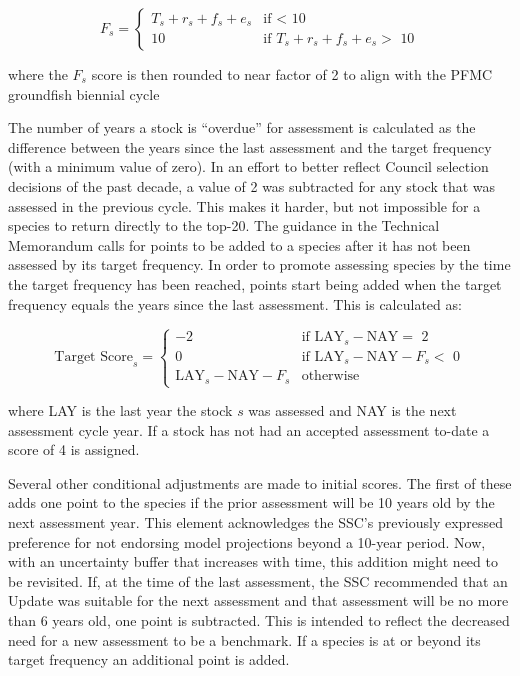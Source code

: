 \documentclass[12pt,]{article}
\begin{document}
\[
F_s =
\begin{cases} 
T_s + r_s + f_s + e_s & \text{if $<$ 10}\\ 
10 & \text{if $T_s + r_s + f_s + e_s >$ 10} 
\end{cases}
\]

where the \(F_s\) score is then rounded to near factor of 2 to align
with the PFMC groundfish biennial cycle

The number of years a stock is ``overdue'' for assessment is calculated
as the difference between the years since the last assessment and the
target frequency (with a minimum value of zero). In an effort to better
reflect Council selection decisions of the past decade, a value of 2 was
subtracted for any stock that was assessed in the previous cycle. This
makes it harder, but not impossible for a species to return directly to
the top-20. The guidance in the Technical Memorandum calls for points to
be added to a species after it has not been assessed by its target
frequency. In order to promote assessing species by the time the target
frequency has been reached, points start being added when the target
frequency equals the years since the last assessment. This is calculated
as:

\[
\text{Target Score}_s = 
\begin{cases}
-2 & \text{if $\text{LAY}_{s} - \text{NAY} =$ 2}\\
0  & \text{if $\text{LAY}_{s} - \text{NAY} - F_s < $ 0}\\
\text{LAY}_{s} - \text{NAY} - F_s & \text{otherwise}
\end{cases}
\]

where LAY is the last year the stock \(s\) was assessed and NAY is the
next assessment cycle year. If a stock has not had an accepted
assessment to-date a score of 4 is assigned.

Several other conditional adjustments are made to initial scores. The
first of these adds one point to the species if the prior assessment
will be 10 years old by the next assessment year. This element
acknowledges the SSC's previously expressed preference for not endorsing
model projections beyond a 10-year period. Now, with an uncertainty
buffer that increases with time, this addition might need to be
revisited. If, at the time of the last assessment, the SSC recommended
that an Update was suitable for the next assessment and that assessment
will be no more than 6 years old, one point is subtracted. This is
intended to reflect the decreased need for a new assessment to be a
benchmark. If a species is at or beyond its target frequency an
additional point is added.
\end{document}
